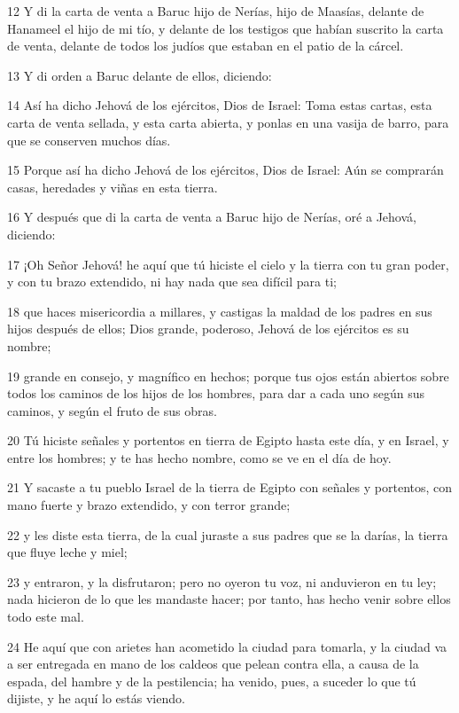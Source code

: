 \par 12 Y di la carta de venta a Baruc hijo de Nerías, hijo de Maasías, delante de Hanameel el hijo de mi tío, y delante de los testigos que habían suscrito la carta de venta, delante de todos los judíos que estaban en el patio de la cárcel.
\par 13 Y di orden a Baruc delante de ellos, diciendo:
\par 14 Así ha dicho Jehová de los ejércitos, Dios de Israel: Toma estas cartas, esta carta de venta sellada, y esta carta abierta, y ponlas en una vasija de barro, para que se conserven muchos días.
\par 15 Porque así ha dicho Jehová de los ejércitos, Dios de Israel: Aún se comprarán casas, heredades y viñas en esta tierra.
\par 16 Y después que di la carta de venta a Baruc hijo de Nerías, oré a Jehová, diciendo:
\par 17 ¡Oh Señor Jehová! he aquí que tú hiciste el cielo y la tierra con tu gran poder, y con tu brazo extendido, ni hay nada que sea difícil para ti;
\par 18 que haces misericordia a millares, y castigas la maldad de los padres en sus hijos después de ellos; Dios grande, poderoso, Jehová de los ejércitos es su nombre;
\par 19 grande en consejo, y magnífico en hechos; porque tus ojos están abiertos sobre todos los caminos de los hijos de los hombres, para dar a cada uno según sus caminos, y según el fruto de sus obras.
\par 20 Tú hiciste señales y portentos en tierra de Egipto hasta este día, y en Israel, y entre los hombres; y te has hecho nombre, como se ve en el día de hoy.
\par 21 Y sacaste a tu pueblo Israel de la tierra de Egipto con señales y portentos, con mano fuerte y brazo extendido, y con terror grande;
\par 22 y les diste esta tierra, de la cual juraste a sus padres que se la darías, la tierra que fluye leche y miel;
\par 23 y entraron, y la disfrutaron; pero no oyeron tu voz, ni anduvieron en tu ley; nada hicieron de lo que les mandaste hacer; por tanto, has hecho venir sobre ellos todo este mal.
\par 24 He aquí que con arietes han acometido la ciudad para tomarla, y la ciudad va a ser entregada en mano de los caldeos que pelean contra ella, a causa de la espada, del hambre y de la pestilencia; ha venido, pues, a suceder lo que tú dijiste, y he aquí lo estás viendo.
